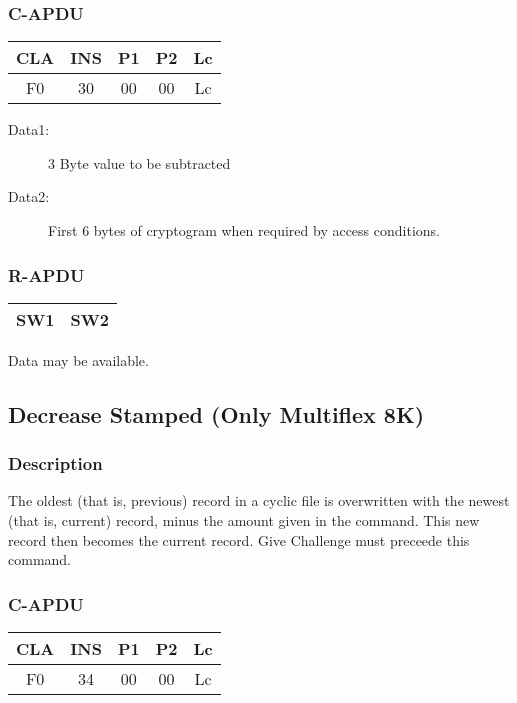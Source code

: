 \documentclass[a4paper,oneside]{article}
\begin{document}
\subsubsection*{C-APDU}

\begin{tabular}{|c|c|c|c|c|} \hline
CLA & INS & P1 & P2 & Lc \\ \hline \hline
F0 & 30 & 00 & 00 & Lc \\ \hline
\end{tabular}

\begin{description}
\item[Data1:] 3 Byte value to be subtracted
\item[Data2:] First 6 bytes of cryptogram when required by access conditions.
\end{description}

\subsubsection*{R-APDU}

\begin{tabular}{|c|c|} \hline
SW1 & SW2 \\ \hline
\end{tabular}

Data may be available.


\subsection{Decrease Stamped (Only Multiflex 8K)}

\subsubsection*{Description}

The oldest (that is, previous) record in a cyclic file is overwritten
with the newest (that is, current) record, minus the amount given
in the command. This new record then becomes the current record.
Give Challenge must preceede this command.

\subsubsection*{C-APDU}

\begin{tabular}{|c|c|c|c|c|} \hline
CLA & INS & P1 & P2 & Lc \\ \hline \hline
F0 & 34 & 00 & 00 & Lc \\ \hline
\end{tabular}
\end{document}
